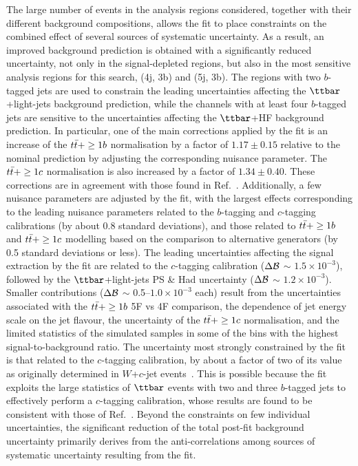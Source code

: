 The large number of events in the analysis regions considered, together with their different background compositions, allows
the fit to place constraints on the combined effect of several sources of systematic uncertainty. 
As a result, an improved background prediction is obtained with a significantly reduced uncertainty, not only in the 
signal-depleted regions, but also in the most sensitive analysis regions for this search, (4j, 3b) and (5j, 3b).
The regions with two $b$-tagged jets are used to constrain the leading uncertainties affecting the $\ttbar$+light-jets background prediction,
while the channels with at least four $b$-tagged jets are sensitive to the uncertainties affecting the $\ttbar$+HF background prediction.  
In particular, one of the main corrections applied by the fit is an increase of the $t\bar{t}+\geq1b$ normalisation by a factor of $1.17 \pm  0.15$ 
relative to the nominal prediction by adjusting the corresponding nuisance parameter.  The $t\bar{t}+\geq1c$ normalisation is also increased
by a factor of $1.34 \pm  0.40$. These corrections are in agreement with those found in Ref.~\cite{Aaboud:2017rss}.
Additionally, a few nuisance parameters are adjusted by the fit, with the largest effects corresponding to the 
leading nuisance parameters related to the $b$-tagging and $c$-tagging calibrations (by about 0.8 standard deviations),
and those related to $t\bar{t}+\geq1b$ and $t\bar{t}+\geq1c$ modelling based on the comparison to alternative generators (by 0.5 standard deviations or less).
The leading uncertainties affecting the signal extraction by the fit are related to the $c$-tagging calibration ($\Delta\mathcal{B}$ $\sim$ $1.5 \times 10^{-3}$),
followed by the $\ttbar$+light-jets PS \& Had uncertainty ($\Delta\mathcal{B}$ $\sim$ $1.2 \times 10^{-3}$). Smaller contributions ($\Delta\mathcal{B}$ $\sim$ 0.5--$1.0 \times 10^{-3}$ each)
result from the uncertainties associated with the $t\bar{t}+\geq1b$ 5F vs 4F comparison, the dependence of jet energy scale on the jet flavour, 
the uncertainty of the $t\bar{t}+\geq1c$ normalisation, and the limited statistics of the simulated samples in some of the bins with the highest signal-to-background ratio.
The uncertainty most strongly constrained by the fit is that related to the $c$-tagging calibration, by about a factor of two of its value as originally determined
in $W$+$c$-jet events~\cite{Aad:2015ydr}. This is possible because the fit exploits the large statistics of $\ttbar$ events with two and three $b$-tagged jets 
to effectively perform a $c$-tagging calibration, whose results are found to be consistent with those of Ref.~\cite{ATLAS-CONF-2018-001}. 
Beyond the constraints on few individual uncertainties, the significant reduction of the total post-fit background uncertainty 
primarily derives from the anti-correlations among sources of systematic uncertainty resulting from the fit.


